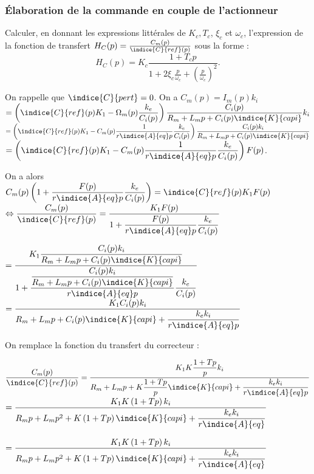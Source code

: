 \documentclass[11pt]{article}
\begin{document}
\subsubsection{Élaboration de la commande en couple de l'actionneur}

\UPSTIquestion  Calculer, en donnant les expressions littérales de $K_{c}, T_{c}$, $\xi_{c}$ et $\omega_{c}$, l'expression de la fonction de transfert $H_{C}(p)=\frac{C_{m}(p)}{\indice{C}{ref}(p)}$ sous la forme :
$$
H_{C}(p)=K_{c} \frac{1+T_{c} p}{1+2 \xi_{c} \frac{p}{\omega_{c}}+\left(\frac{p}{\omega_{c}}\right)^{2}}.
$$

\begin{UPSTIcorrige}
On rappelle que $\indice{C}{pert} = 0$.	
On a $C_m(p) = I_m(p) k_i $ 
$=\left(\indice{C}{ref}(p)K_1- \Omega_m(p) \dfrac{k_e}{C_i(p)}\right) \dfrac{C_i(p)}{R_m + L_mp + C_i(p)\indice{K}{capi}}   k_i $ 
$=\left(\indice{C}{ref}(p)K_1- C_m(p) \dfrac{1}{r\indice{A}{eq}p}\dfrac{k_e}{C_i(p)}\right) \dfrac{C_i(p) k_i}{R_m + L_mp + C_i(p)\indice{K}{capi}} $
$=\left(\indice{C}{ref}(p)K_1- C_m(p) \dfrac{1}{r\indice{A}{eq}p}\dfrac{k_e}{C_i(p)}\right) F(p) $. 

On a alors 
$C_m(p) \left(1+\dfrac{F(p)}{r\indice{A}{eq}p}\dfrac{k_e}{C_i(p)}\right)=\indice{C}{ref}(p)K_1 F(p)$
$ \Leftrightarrow \dfrac{C_m(p) }{\indice{C}{ref}(p)} =\dfrac{K_1 F(p)}{1+\dfrac{F(p)}{r\indice{A}{eq}p}\dfrac{k_e}{C_i(p)}} $

$=\dfrac{K_1 \dfrac{C_i(p) k_i}{R_m + L_mp + C_i(p)\indice{K}{capi}}}{1+\dfrac{\dfrac{C_i(p) k_i}{R_m + L_mp + C_i(p)\indice{K}{capi}}}{r\indice{A}{eq}p}\dfrac{k_e}{C_i(p)}} $
$=\dfrac{K_1 C_i(p) k_i}{R_m + L_mp + C_i(p)\indice{K}{capi}+\dfrac{k_e k_i}{r\indice{A}{eq}p}} $

On remplace la fonction du transfert du correcteur :

$\dfrac{C_m(p) }{\indice{C}{ref}(p)}=\dfrac{K_1 K\dfrac{1+Tp}{p} k_i}{R_m + L_mp + K\dfrac{1+Tp}{p}\indice{K}{capi}+\dfrac{k_e k_i}{r\indice{A}{eq}p}} $
$=\dfrac{K_1 K\left(1+Tp\right) k_i}{R_mp + L_mp^2 + K\left(1+Tp\right)\indice{K}{capi}+\dfrac{k_e k_i}{r\indice{A}{eq}}} $

$=\dfrac{K_1 K\left(1+Tp\right) k_i}{R_mp + L_mp^2 + K\left(1+Tp\right)\indice{K}{capi}+\dfrac{k_e k_i}{r\indice{A}{eq}}} $



\end{UPSTIcorrige}
\end{document}

